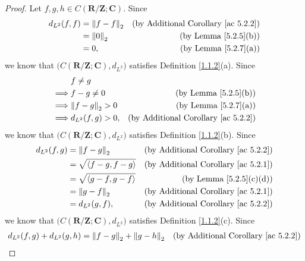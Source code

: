 \begin{proof}
    Let \(f, g, h \in C(\mathbf{R} / \mathbf{Z} ; \mathbf{C})\).
    Since
    \begin{align*}
        d_{L^2}(f, f) & = \norm*{f - f}_2 & \text{(by Additional Corollary \ref{ac 5.2.2})} \\
                      & = \norm*{0}_2     & \text{(by Lemma \ref{5.2.5}(b))}                \\
                      & = 0,              & \text{(by Lemma \ref{5.2.7}(a))}
    \end{align*}
    we know that \(\big(C(\mathbf{R} / \mathbf{Z} ; \mathbf{C}), d_{L^2}\big)\) satisfies Definition \ref{1.1.2}(a).
    Since
    \begin{align*}
                 & f \neq g                                                              \\
        \implies & f - g \neq 0        & \text{(by Lemma \ref{5.2.5}(b))}                \\
        \implies & \norm*{f - g}_2 > 0 & \text{(by Lemma \ref{5.2.7}(a))}                \\
        \implies & d_{L^2}(f, g) > 0,  & \text{(by Additional Corollary \ref{ac 5.2.2})}
    \end{align*}
    we know that \(\big(C(\mathbf{R} / \mathbf{Z} ; \mathbf{C}), d_{L^2}\big)\) satisfies Definition \ref{1.1.2}(b).
    Since
    \begin{align*}
        d_{L^2}(f, g) & = \norm*{f - g}_2              & \text{(by Additional Corollary \ref{ac 5.2.2})} \\
                      & = \sqrt{\inner*{f - g, f - g}} & \text{(by Additional Corollary \ref{ac 5.2.1})} \\
                      & = \sqrt{\inner*{g - f, g - f}} & \text{(by Lemma \ref{5.2.5}(c)(d))}             \\
                      & = \norm*{g - f}_2              & \text{(by Additional Corollary \ref{ac 5.2.1})} \\
                      & = d_{L^2}(g, f),               & \text{(by Additional Corollary \ref{ac 5.2.2})}
    \end{align*}
    we know that \(\big(C(\mathbf{R} / \mathbf{Z} ; \mathbf{C}), d_{L^2}\big)\) satisfies Definition \ref{1.1.2}(c).
    Since
    \begin{align*}
        d_{L^2}(f, g) + d_{L^2}(g, h) & = \norm*{f - g}_2 + \norm*{g - h}_2 & \text{(by Additional Corollary \ref{ac 5.2.2})} \\

\end{align*}
\end{proof}
